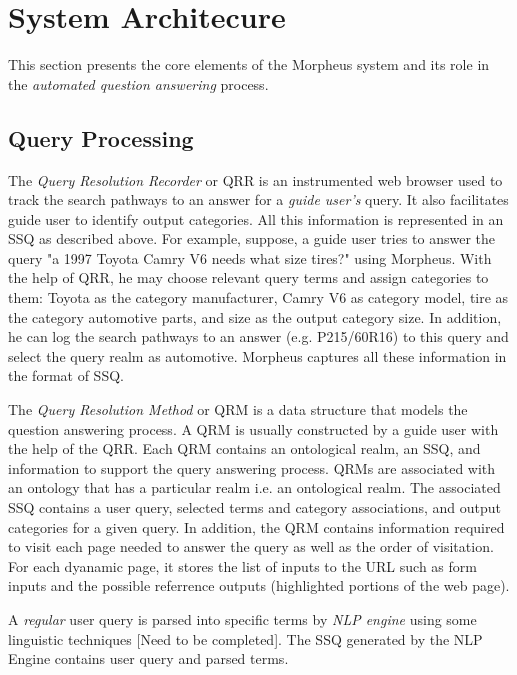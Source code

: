 \section{System Architecure}
\label{sec:systemarch}

This section presents the core elements of the Morpheus system and its 
role in the \textit{automated question answering} process. 

\subsection{Query Processing}
  
The \textit{Query Resolution Recorder} or QRR is an instrumented web browser
used to
track the search pathways to an answer for a \textit{guide user's} query. It
also facilitates guide user to identify output categories. All this information
is represented in an SSQ as described above. For example, suppose, a guide user
tries to answer the query "a 1997 Toyota Camry V6 needs what size tires?" using
Morpheus. With the help of QRR, he may choose relevant query terms and assign
categories to them: Toyota as the category manufacturer, Camry V6 as category
model, tire as the category automotive parts, and size as the output category
size. In addition, he can log the search pathways to an answer (e.g. P215/60R16)
to this query and select the query realm as automotive. Morpheus captures all
these information in the format of SSQ.     


The \textit{Query Resolution Method} or QRM is a data structure that models the
question answering process. A QRM is usually constructed by a guide user with
the help of the QRR. Each QRM contains an ontological realm, an SSQ, and
information to support the query answering process. QRMs are associated with an
ontology that
has a particular realm i.e. an ontological realm. The associated SSQ contains a
user query, selected terms and category associations, and output categories for
a given query. In addition, the QRM contains information required to visit each
page needed to answer the query as well as the order of visitation. For each
dyanamic page, it stores the list of inputs to the URL such as form inputs and
the possible referrence outputs (highlighted portions of the web page).


A \textit{regular} user query is parsed into specific terms by \textit{NLP
engine} using
some linguistic techniques [Need to be completed]. The SSQ generated by the NLP
Engine contains user query and parsed terms. 


